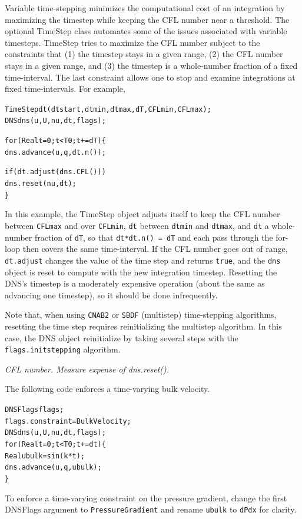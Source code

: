 \documentclass{article}[12pt]
\begin{document}
Variable time-stepping minimizes the computational cost of an integration
by maximizing the timestep while keeping the CFL number near a threshold.
The optional TimeStep class automates some of the issues associated with
variable timesteps. TimeStep tries to maximize the CFL number subject to
the constraints that (1) the timestep stays in a given range, (2) the CFL
number stays in a given range, and (3) the timestep is a whole-number
fraction of a fixed time-interval. The last constraint allows one to
stop and examine integrations at fixed time-intervals. For example,
\begin{alltt}
   TimeStep dt(dtstart, dtmin, dtmax, dT, CFLmin, CFLmax);
   DNS dns(u, U, nu, dt, flags);

   for (Real t=0; t<T0; t += dT) \{
     dns.advance(u, q, dt.n());

     if (dt.adjust(dns.CFL()))
       dns.reset(nu, dt);
   \}
\end{alltt}
In this example, the TimeStep object adjusts itself to keep the
CFL number between {\tt CFLmax} and over {\tt CFLmin}, {\tt dt}
between {\tt dtmin} and {\tt dtmax}, and {\tt dt} a whole-number
fraction of {\tt dT}, so that {\tt dt*dt.n() = dT} and each pass
through the for-loop then covers the same time-interval. If the
CFL number goes out of range, {\tt dt.adjust} changes the value
of the time step and returns {\tt true}, and the {\tt dns}
object is reset to compute with the new integration timestep.
Resetting the DNS's timestep is a moderately expensive
operation (about the same as advancing one timestep), so it
should be done infrequently.

Note that, when using {\tt CNAB2} or {\tt SBDF} (multistep) time-stepping
algorithms, resetting the time step requires reinitializing the multistep
algorithm. In this case, the DNS object reinitialize by taking several
steps with the {\tt flags.initstepping} algorithm.

{\em CFL number. Measure expense of dns.reset().}


The following code enforces a time-varying bulk velocity.
\begin{alltt}
   DNSFlags flags;
   flags.constraint = BulkVelocity;
   DNS dns(u, U, nu, dt, flags);
   for (Real t=0; t<T0; t += dt) \{
     Real ubulk = sin(k*t);
     dns.advance(u, q, ubulk);
   \}
\end{alltt}
To enforce a time-varying constraint on the pressure gradient,
change the first DNSFlags argument to {\tt PressureGradient} and
rename {\tt ubulk} to {\tt dPdx} for clarity.
\end{document}

